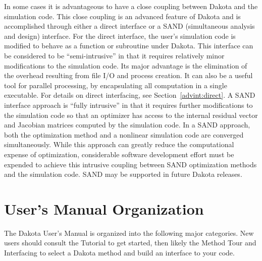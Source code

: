 In some cases it is advantageous to have a close coupling between
Dakota and the simulation code. This close coupling is an advanced
feature of Dakota and is accomplished through either a direct
interface or a SAND (simultaneous analysis and design) interface. For
the direct interface, the user's simulation code is modified to behave
as a function or subroutine under Dakota. This interface can be
considered to be ``semi-intrusive'' in that it requires relatively
minor modifications to the simulation code. Its major advantage is the
elimination of the overhead resulting from file I/O and process
creation. It can also be a useful tool for parallel processing, by
encapsulating all computation in a single executable. For details on
direct interfacing, see Section~\ref{advint:direct}. A SAND interface
approach is ``fully intrusive'' in that it requires further
modifications to the simulation code so that an optimizer has access
to the internal residual vector and Jacobian matrices computed by the
simulation code. In a SAND approach, both the optimization method and
a nonlinear simulation code are converged simultaneously. While this
approach can greatly reduce the computational expense of optimization,
considerable software development effort must be expended to achieve
this intrusive coupling between SAND optimization methods and the
simulation code. SAND may be supported in future Dakota releases.


\section{User's Manual Organization}\label{intro:organization}

The Dakota User's Manual is organized into the following major
categories. New users should consult the Tutorial to get started,
then likely the Method Tour and Interfacing to select a Dakota method
and build an interface to your code. 

